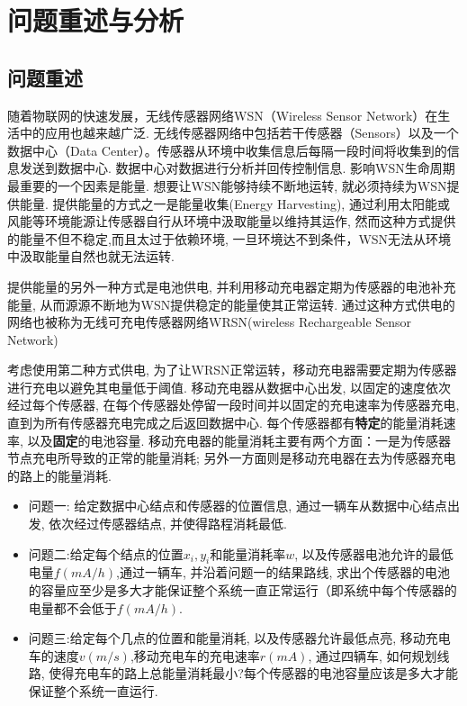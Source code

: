 \section{问题重述与分析}
	\subsection{问题重述}

	随着物联网的快速发展，无线传感器网络WSN（Wireless Sensor Network）在生活中的应用也越来越广泛. 无线传感器网络中包括若干传感器（Sensors）以及一个数据中心（Data Center）。传感器从环境中收集信息后每隔一段时间将收集到的信息发送到数据中心. 数据中心对数据进行分析并回传控制信息.
	影响WSN生命周期最重要的一个因素是能量. 想要让WSN能够持续不断地运转, 就必须持续为WSN提供能量. 提供能量的方式之一是能量收集(Energy Harvesting), 通过利用太阳能或风能等环境能源让传感器自行从环境中汲取能量以维持其运作, 然而这种方式提供的能量不但不稳定,而且太过于依赖环境, 一旦环境达不到条件，WSN无法从环境中汲取能量自然也就无法运转.
	
	提供能量的另外一种方式是电池供电, 并利用移动充电器定期为传感器的电池补充能量, 从而源源不断地为WSN提供稳定的能量使其正常运转. 通过这种方式供电的网络也被称为无线可充电传感器网络WRSN(wireless Rechargeable Sensor Network)

	考虑使用第二种方式供电, 为了让WRSN正常运转，移动充电器需要定期为传感器进行充电以避免其电量低于阈值. 移动充电器从数据中心出发, 以固定的速度依次经过每个传感器, 在每个传感器处停留一段时间并以固定的充电速率为传感器充电, 直到为所有传感器充电完成之后返回数据中心. 每个传感器都有\textbf{特定}的能量消耗速率, 以及\textbf{固定}的电池容量. 移动充电器的能量消耗主要有两个方面：一是为传感器节点充电所导致的正常的能量消耗; 另外一方面则是移动充电器在去为传感器充电的路上的能量消耗.

	\begin{itemize}
		\item 问题一: 给定数据中心结点和传感器的位置信息, 通过一辆车从数据中心结点出发, 依次经过传感器结点, 并使得路程消耗最低.
		\item 问题二:给定每个结点的位置$x_i,y_i$和能量消耗率$w$, 以及传感器电池允许的最低电量$f(mA/h)$,通过一辆车, 并沿着问题一的结果路线, 求出个传感器的电池的容量应至少是多大才能保证整个系统一直正常运行（即系统中每个传感器的电量都不会低于$f(mA/h)$.
		\item 问题三:给定每个几点的位置和能量消耗, 以及传感器允许最低点亮, 移动充电车的速度$v(m/s)$,移动充电车的充电速率$r(mA)$, 通过四辆车, 如何规划线路, 使得充电车的路上总能量消耗最小?每个传感器的电池容量应该是多大才能保证整个系统一直运行.
	\end{itemize}
	
